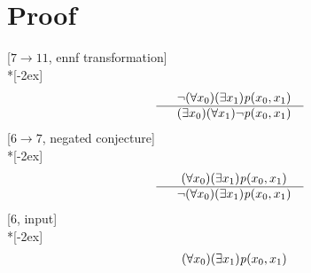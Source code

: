 \documentclass[fleqn]{article}
\newenvironment{VampireProof}{%
   \section{Proof}}{}
\newenvironment{VampireInference}{%
   \begin{array}{c}}{\end{array}}
\newenvironment{VampirePremise}%
   {\begin{array}{l}}%
   {\end{array}}
\newenvironment{VampireConclusion}%
   {\begin{array}{l}}%
   {\end{array}}
\newcommand{\VConclusionSeparator}{\\ \hline}
\begin{document}
\begin{VampireProof}
\[\]
[$7\rightarrow 11$, ennf transformation]\\*[-2ex]
\[\begin{VampireInference}
\begin{VampirePremise}%
~~\neg (\forall x_{0} )(\exists x_{1} )\mathit{p} (x_{0},x_{1})
\end{VampirePremise}
\VConclusionSeparator
\begin{VampireConclusion}
~~(\exists x_{0} )(\forall x_{1} )\neg \mathit{p} (x_{0},x_{1})
\end{VampireConclusion}
\end{VampireInference}
\]
[$6\rightarrow 7$, negated conjecture]\\*[-2ex]
\[\begin{VampireInference}
\begin{VampirePremise}%
~~(\forall x_{0} )(\exists x_{1} )\mathit{p} (x_{0},x_{1})
\end{VampirePremise}
\VConclusionSeparator
\begin{VampireConclusion}
~~\neg (\forall x_{0} )(\exists x_{1} )\mathit{p} (x_{0},x_{1})
\end{VampireConclusion}
\end{VampireInference}
\]
[$6$, input]\\*[-2ex]
\[\begin{VampireInference}
\begin{VampireConclusion}
~~(\forall x_{0} )(\exists x_{1} )\mathit{p} (x_{0},x_{1})
\end{VampireConclusion}
\end{VampireInference}
\]
\end{VampireProof}
\end{document}
